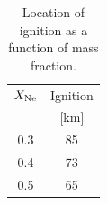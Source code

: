 \documentclass[modern]{aastex62}
\begin{document}
\begin{table}
  \centering
  \caption{Location of ignition as a function of \neon[20] mass
    fraction.}
  \label{tab:ONe-ignition}
  \begin{tabular}{cc}
    \hline
    $X_{\rm Ne}$ & Ignition \\
     & [km] \\
    \hline
    0.3 & 85 \\
    0.4 & 73\\
    0.5 & 65 \\
    \hline
  \end{tabular}
\end{table}



\end{document}
